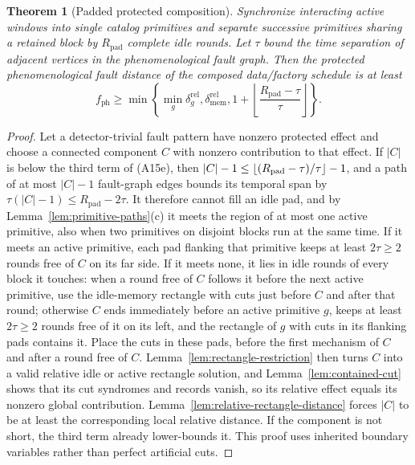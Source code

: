 \documentclass[aps,prx,reprint,superscriptaddress,nofootinbib,floatfix,longbibliography]{revtex4-2}
\newtheorem{theorem}{Theorem}[section]
\theoremstyle{definition}
\begin{document}
\begin{theorem}[Padded protected composition]\label{thm:padded-protected-composition}
Synchronize interacting active windows into single catalog primitives and
separate successive primitives sharing a retained block by
$R_{\mathrm{pad}}$ complete idle rounds.  Let $\tau$ bound the time separation of
adjacent vertices in the phenomenological fault graph.  Then the protected
phenomenological fault distance of the composed data/factory schedule is at
least
\begin{equation}
 f_{\mathrm{ph}}\geq
 \min\!\left\{\min_g\delta_g^{\mathrm{rel}},\delta_{\mathrm{mem}}^{\mathrm{rel}},
 1+\left\lfloor\frac{R_{\mathrm{pad}}-\tau}{\tau}\right\rfloor\right\}.
                                                                    \tag{A15e}
\end{equation}
\end{theorem}
\begin{proof}
Let a detector-trivial fault pattern have nonzero protected effect and choose
a connected component $C$ with nonzero contribution to that effect.  If
$|C|$ is below the third term of (A15e), then $|C|-1\le\lfloor(R_{\rm pad}-\tau)/\tau\rfloor-1$,
and a path of at most $|C|-1$ fault-graph edges bounds its temporal span by
$\tau(|C|-1)\le R_{\mathrm{pad}}-2\tau$.  It therefore cannot fill an idle
pad, and by Lemma~\ref{lem:primitive-paths}(c) it meets the region of at most
one active primitive, also when two primitives on disjoint blocks run at the
same time.  If it meets an active
primitive, each pad flanking that primitive keeps at least $2\tau\ge2$ rounds
free of $C$ on its far side.  If it meets none, it lies in idle rounds of
every block it touches: when a round free of $C$ follows it before the next
active primitive, use the idle-memory rectangle with cuts just before $C$ and
after that round; otherwise $C$ ends immediately before an active primitive
$g$, keeps at least $2\tau\ge2$ rounds free of it on its left, and the
rectangle of $g$ with cuts in its flanking pads contains it.  Place the cuts
in these pads, before the first mechanism of $C$ and after a round free of
$C$.  Lemma~\ref{lem:rectangle-restriction} then turns $C$ into a valid
relative idle or active rectangle solution, and Lemma~\ref{lem:contained-cut}
shows that its cut syndromes and records vanish, so its relative effect
equals its nonzero global contribution.  Lemma~\ref{lem:relative-rectangle-distance} forces
$|C|$ to be at least the corresponding local relative distance.  If the
component is not short, the third term already lower-bounds it.  This proof
uses inherited boundary variables rather than perfect artificial cuts.
\end{proof}
\end{document}
